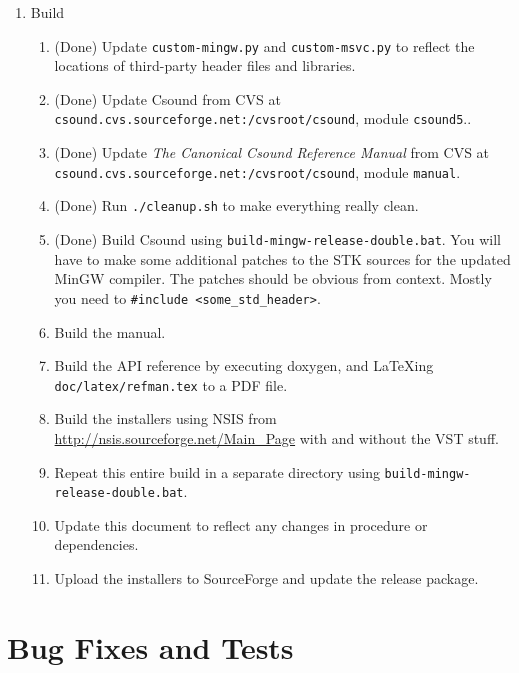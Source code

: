 \documentclass[11pt,letterpaper,onecolumn]{scrartcl}
\begin{document}
\begin{sloppypar}
\begin{enumerate}
\begin{enumerate}
		\end{enumerate}
	\item Build   
		\begin{enumerate}
    	\item (Done) Update \texttt{custom-mingw.py} and \texttt{custom-msvc.py} to reflect the locations of third-party header files and libraries.
			\item (Done) Update Csound from CVS at \verb|csound.cvs.sourceforge.net:/cvsroot/csound|, module \texttt{csound5}..
			\item (Done) Update \emph{The Canonical Csound Reference Manual} from CVS at \verb|csound.cvs.sourceforge.net:/cvsroot/csound|, module \texttt{manual}.
			\item (Done) Run \texttt{./cleanup.sh} to make everything really clean.
	    \item (Done) Build Csound using \texttt{build-mingw-release-double.bat}. You will have to make some additional patches to the STK sources for the updated MinGW compiler. The patches should be obvious from context. Mostly you need to \verb|#include <some_std_header>|.
	    \item Build the manual.
	    \item Build the API reference by executing doxygen, and LaTeXing \texttt{doc/latex/refman.tex} to a PDF file.
	    \item Build the installers using NSIS from \url{http://nsis.sourceforge.net/Main_Page} with and without the VST stuff.   
	    \item Repeat this entire build in a separate directory using \texttt{build-mingw-release-double.bat}. 
	    \item Update this document to reflect any changes in procedure or dependencies. 
	    \item Upload the installers to SourceForge and update the release package.
		\end{enumerate}
 \end{enumerate}

\section{Bug Fixes and Tests}
\label{sec:BugFixesAndTests}


\end{sloppypar}
\end{document}
